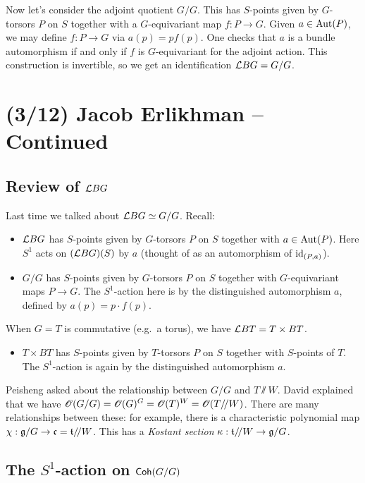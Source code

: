 \documentclass{article}
\begin{document}
Now let's consider the adjoint quotient $G / G$.
This has $S$-points given by $G$-torsors $P$ on $S$ together with a $G$-equivariant map $f: P \to G$.
Given $a \in \operatorname{Aut}(P)$, we may define $f: P \to G$ via $a(p) = p f(p)$.
One checks that $a$ is a bundle automorphism if and only if $f$ is $G$-equivariant for the adjoint action.
This construction is invertible, so we get an identification $\mathcal{L} BG = G / G$.

\section{(3/12) Jacob Erlikhman -- Continued}

\subsection{Review of $\mathcal{L} BG$}

Last time we talked about $\mathcal{L} BG \simeq G / G$.
Recall:
\begin{itemize}
  \item $\mathcal{L} BG$ has $S$-points given by $G$-torsors $P$ on $S$ together with $a \in \operatorname{Aut}(P)$.
    Here $S^1$ acts on $(\mathcal{L} BG)(S)$ by $a$ (thought of as an automorphism of $\operatorname{id}_{(P,a)}$).
  \item $G / G$ has $S$-points given by $G$-torsors $P$ on $S$ together with $G$-equivariant maps $P \to G$.
    The $S^1$-action here is by the distinguished automorphism $a$, defined by $a(p) = p \cdot f(p)$.
\end{itemize}
When $G = T$ is commutative (e.g.\ a torus), we have $\mathcal{L} BT = T \times BT$.
\begin{itemize}
  \item $T \times BT$ has $S$-points given by $T$-torsors $P$ on $S$ together with $S$-points of $T$.
    The $S^1$-action is again by the distinguished automorphism $a$.
\end{itemize}

\begin{rmk}
  Peisheng asked about the relationship between $G / G$ and $T \sslash W$.
  David explained that we have $\mathscr{O}(G / G) = \mathscr{O}(G)^G = \mathscr{O}(T)^W = \mathscr{O}(T /\mkern-3mu/ W)$.
  There are many relationships between these: for example, there is a characteristic polynomial map $\chi: \mathfrak{g} / G \to \mathfrak{c} = \mathfrak{t} /\mkern-3mu/ W$.
  This has a \emph{Kostant section} $\kappa: \mathfrak{t} /\mkern-3mu/ W \to \mathfrak{g} / G$.
\end{rmk}

\subsection{The $S^1$-action on $\mathsf{Coh}(G / G)$}
\end{document}
